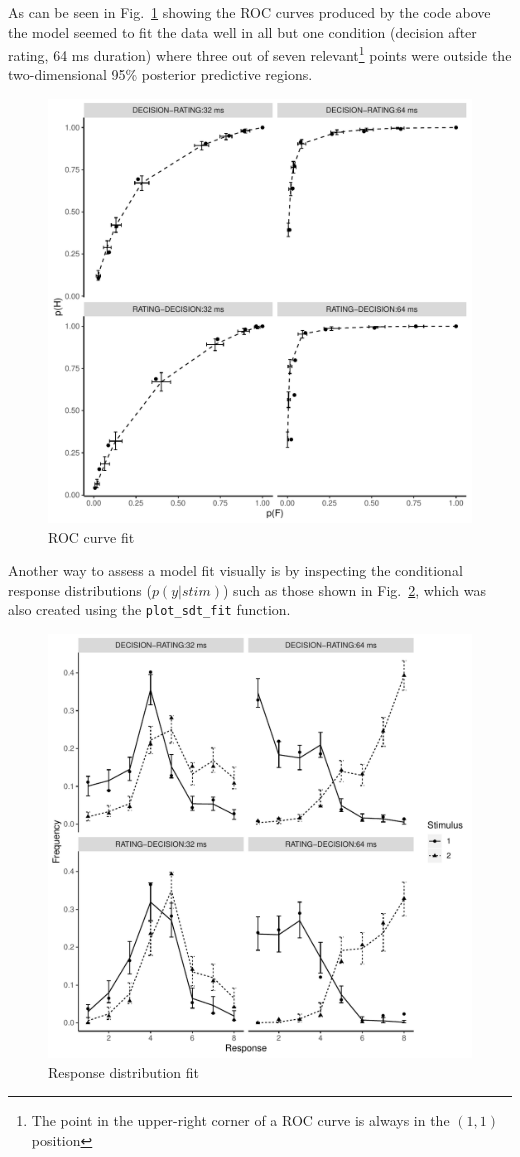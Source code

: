 \documentclass[oneside,a4paper]{article}
\begin{document}
As can be seen in Fig.~\ref{fig:3} showing the ROC curves produced by
the code above the model seemed to fit the data well in all but one
condition (decision after rating, 64 ms duration) where three out of
seven relevant\footnote{The point in the upper-right corner of a ROC
  curve is always in the $(1,1)$ position} points were outside the
two-dimensional 95\% posterior predictive regions.

\begin{figure}[H]
  \centering
  \includegraphics[width=.8\linewidth]{roc_fit.pdf}
  \caption{ROC curve fit}
  \label{fig:3}
\end{figure}

Another way to assess a model fit visually is by inspecting the
conditional response distributions ($p(y|stim)$) such as those shown
in Fig.~\ref{fig:4}, which was also created using the
\texttt{plot\_sdt\_fit} function.

\begin{figure}[H]
  \centering
  \includegraphics[width=.8\linewidth]{response_fit.pdf}
  \caption{Response distribution fit}
  \label{fig:4}
\end{figure}
\end{document}
